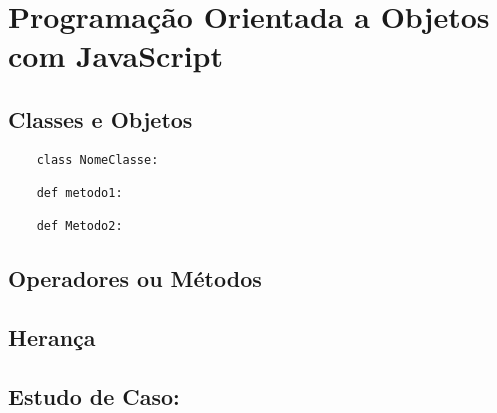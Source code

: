 

\chapter{ Programa\c{c}\~{a}o Orientada a Objetos com JavaScript}



    \section{Classes e Objetos}


   \begin{lstlisting}
    class NomeClasse:

    def metodo1:

    def Metodo2:

    \end{lstlisting}

    \section{Operadores ou M\'{e}todos}


    \section{Heran\c{c}a}


    \section{Estudo de Caso: }
